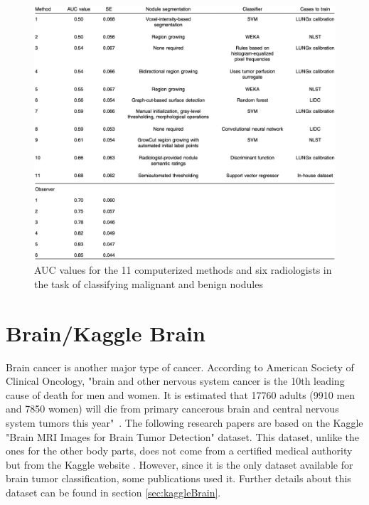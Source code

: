 \begin{figure}[!h]
\centering
\includegraphics[width=1\textwidth, keepaspectratio=true]{./figures/LUNGx_challenge_all_results.png}
\caption{AUC values for the 11 computerized methods and six radiologists in the task of classifying malignant and benign nodules~\cite{12}}
\label{fig:LUNGx_challenge_all_results}
\end{figure}



\section{Brain/Kaggle Brain}

\setlength{\marginparwidth}{3cm}\leavevmode {}Brain cancer is another major type of cancer. According to American Society of Clinical Oncology, "brain and other nervous system cancer is the 10th leading cause of death for men and women. It is estimated that 17760 adults (9910 men and 7850 women) will die from primary cancerous brain and central nervous system tumors this year"~\cite{43}. The following research papers are based on the Kaggle "Brain MRI Images for Brain Tumor Detection" dataset. This dataset, unlike the ones for the other body parts, does not come from a certified medical authority but from the Kaggle website \cite{45}. However, since it is the only dataset available for brain tumor classification, some publications used it. Further details about this dataset can be found in section \ref{sec:kaggleBrain}.


